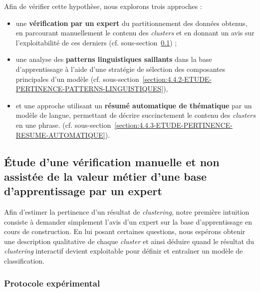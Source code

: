 	Afin de vérifier cette hypothèse, nous explorons trois approches :
	\begin{itemize}
		\item une \textbf{vérification par un expert} du partitionnement des données obtenus, en parcourant manuellement le contenu des \textit{clusters} et en donnant un avis sur l'exploitabilité de ces derniers (cf. sous-section~\ref{section:4.4.1-ETUDE-PERTINENCE-VERIFICATION-MANUELLE}) ;
		\item une analyse des \textbf{patterns linguistiques saillants} dans la base d'apprentissage à l'aide d'une stratégie de sélection des composantes principales d'un modèle (cf. sous-section~\ref{section:4.4.2-ETUDE-PERTINENCE-PATTERNS-LINGUISTIQUES}),
		\item et une approche utilisant un \textbf{résumé automatique de thématique} par un modèle de langue, permettant de décrire succinctement le contenu des \textit{clusters} en une phrase. (cf. sous-section~\ref{section:4.4.3-ETUDE-PERTINENCE-RESUME-AUTOMATIQUE}).
	\end{itemize}
	
	
	\subsection{Étude d'une vérification manuelle et non assistée de la valeur métier d'une base d'apprentissage par un expert}
	\label{section:4.4.1-ETUDE-PERTINENCE-VERIFICATION-MANUELLE}
		
		Afin d'estimer la pertinence d'un résultat de \textit{clustering}, notre première intuition consiste à demander simplement l'avis d'un expert sur la base d'apprentissage en cours de construction.
		En lui posant certaines questions, nous espérons obtenir une description qualitative de chaque \textit{cluster} et ainsi déduire quand le résultat du \textit{clustering} interactif devient exploitable pour définir et entraîner un modèle de classification.
	
		\subsubsection{Protocole expérimental}
			
